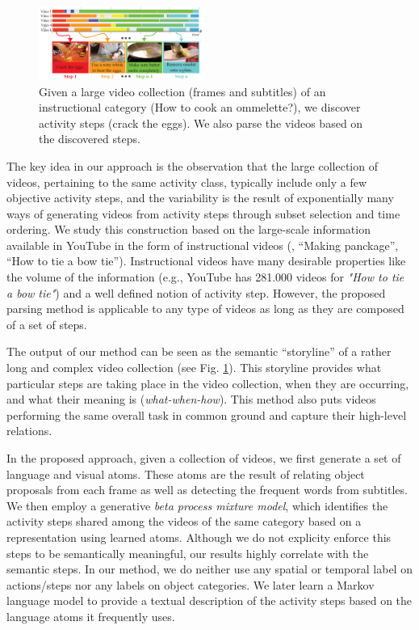 \begin{figure}[h!]
  \includegraphics[width=0.48\textwidth]{Figure_1_flattened}
  \caption{Given a large video collection (frames and subtitles) of an instructional category (\eg How to cook an ommelette?), we discover activity steps (\eg crack the eggs). We also parse the videos based on the discovered steps.}
  \label{teaser}
  \vspace{-5mm}
\end{figure}


The key idea in our approach is the observation that the large collection of videos, pertaining to the same activity class, typically include only a few objective activity steps, and the variability is the result of exponentially many ways of generating videos from activity steps through subset selection and time ordering. We study this construction based on the large-scale information available in YouTube in the form of instructional videos  (\eg, ``Making panckage'', ``How to tie a bow tie''). Instructional videos have many desirable properties like the volume of the information (e.g., YouTube has 281.000 videos for \emph{"How to tie a bow tie"}) and a well defined notion of activity step.  However, the proposed parsing method is applicable to any type of videos as long as they are composed of a set of steps.

The output of our method can be seen as the semantic ``storyline'' of a rather long and complex video collection (see Fig. \ref{teaser}). This storyline provides what particular steps are taking place in the video collection, when they are occurring, and what their meaning is (\emph{what-when-how}). This method also puts videos performing the same overall task in common ground and capture their high-level relations.


In the proposed approach, given a collection of videos, we first generate a set of language and visual atoms. These atoms are the result of relating object proposals from each frame as well as detecting the frequent words from subtitles. We then employ a generative \emph{beta process mixture model}, which identifies the activity steps shared among the videos of the same category based on a representation using learned atoms. Although we do not explicity enforce this steps to be semantically meaningful, our results highly correlate with the semantic steps. In our method, we do neither use any spatial or temporal label on actions/steps nor any labels on object categories. We later learn a Markov language model to provide a textual description of the activity steps based on the language atoms it frequently uses.

